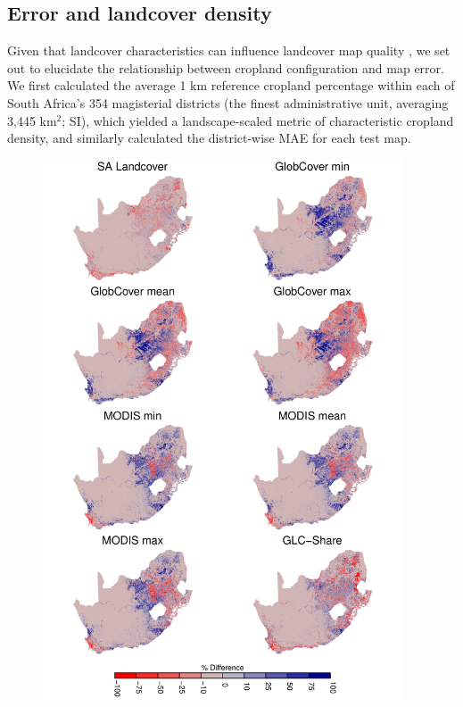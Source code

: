 \documentclass{pnastwo}
\begin{document}
\begin{article}
\subsection{Error and landcover density}
Given that landcover characteristics can influence landcover map quality \cite{see_improved_2015, estes_platform_2015, debats_generalized_2015}, we set out to elucidate the relationship between cropland configuration and map error.  We first calculated the average 1 km reference cropland percentage within each of South Africa's 354 magisterial districts (the finest administrative unit, averaging 3,445 km$^2$; SI), which yielded a landscape-scaled metric of characteristic cropland density, and similarly calculated the district-wise MAE for each test map. 

\begin{figure}[hb]
\centerline{\includegraphics[width=0.95\textwidth]{figures/figure1.pdf}}

\end{figure}
\end{article}
\end{document}
